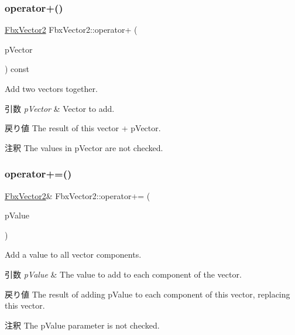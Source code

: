 \subsubsection{\texorpdfstring{operator+()}{operator+()}\hspace{0.1cm}{\footnotesize\ttfamily [2/2]}}
{\footnotesize\ttfamily \hyperlink{class_fbx_vector2}{Fbx\+Vector2} Fbx\+Vector2\+::operator+ (\begin{DoxyParamCaption}\item[{const \hyperlink{class_fbx_vector2}{Fbx\+Vector2} \&}]{p\+Vector }\end{DoxyParamCaption}) const}

Add two vectors together. 
\begin{DoxyParams}{引数}
{\em p\+Vector} & Vector to add. \\
\hline
\end{DoxyParams}
\begin{DoxyReturn}{戻り値}
The result of this vector + p\+Vector. 
\end{DoxyReturn}
\begin{DoxyRemark}{注釈}
The values in p\+Vector are not checked. 
\end{DoxyRemark}
\mbox{\label{class_fbx_vector2_a76dca064eec29688ef5ef27be0f6951f}} 
\subsubsection{\texorpdfstring{operator+=()}{operator+=()}\hspace{0.1cm}{\footnotesize\ttfamily [1/2]}}
{\footnotesize\ttfamily \hyperlink{class_fbx_vector2}{Fbx\+Vector2}\& Fbx\+Vector2\+::operator+= (\begin{DoxyParamCaption}\item[{double}]{p\+Value }\end{DoxyParamCaption})}

Add a value to all vector components. 
\begin{DoxyParams}{引数}
{\em p\+Value} & The value to add to each component of the vector. \\
\hline
\end{DoxyParams}
\begin{DoxyReturn}{戻り値}
The result of adding p\+Value to each component of this vector, replacing this vector. 
\end{DoxyReturn}
\begin{DoxyRemark}{注釈}
The p\+Value parameter is not checked. 
\end{DoxyRemark}
\mbox{\label{class_fbx_vector2_abd3355ddb4401ca0a774c6b46726fb44}} 
